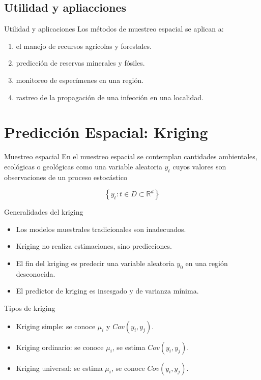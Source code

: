 \documentclass[12pts]{beamer}
\begin{document}
	\subsection{Utilidad y apliacciones}
	\begin{frame}{Utilidad y aplicaciones}
		Los métodos de muestreo espacial se aplican a:
		\begin{enumerate}
			\item el manejo de recursos agrícolas y forestales.
			\item predicción de reservas minerales y fósiles.
			\item monitoreo de especímenes en una región.
			\item rastreo de la propagación de una infección en una localidad. 
		\end{enumerate}
	\end{frame}

	\section{Predicción Espacial: Kriging}
	\begin{frame}{Muestreo espacial}
		En el muestreo espacial se contemplan cantidades ambientales, ecológicas o geológicas como una variable aleatoria  $y_t$ cuyos valores son observaciones de un proceso estocástico
		
		\begin{equation}
		\left\lbrace y_t : t \in D \subset \mathbb{R}^d \right\rbrace\label{proceso}
		\end{equation}
		
	\end{frame}
	
	\begin{frame}{Generalidades del kriging}
		\begin{itemize}
			\item Los modelos muestrales tradicionales son inadecuados.
			\item Kriging no realiza estimaciones, sino predicciones. 
			\item El fin del kriging es predecir una variable aleatoria $y_0$ en una región desconocida.
			\item El predictor de kriging es insesgado y de varianza mínima.
		\end{itemize}
	\end{frame}

	\begin{frame}{Tipos de kriging}
		\begin{itemize}
			\item Kriging simple: se conoce $\mu_i$ y $Cov(y_i, y_j)$.
			\item Kriging ordinario: se conoce $\mu_i$, se estima $Cov(y_i, y_j)$. 
			\item Kriging universal: se estima $\mu_i$, se conoce $Cov(y_i, y_j)$.
		\end{itemize}
	\end{frame}
\end{document}

